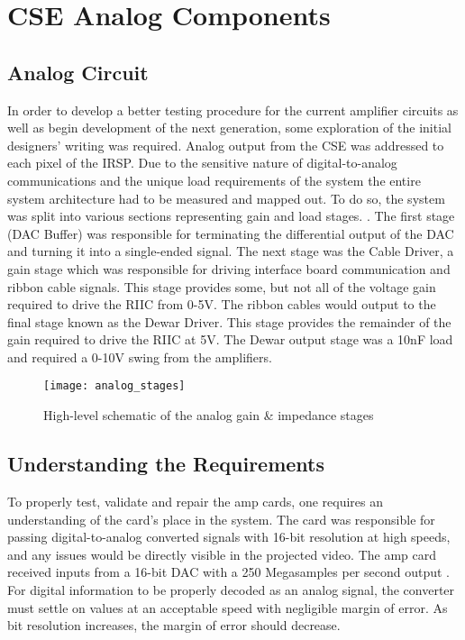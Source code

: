 %
%
\chapter{CSE Analog Components}
\section{Analog Circuit}
In order to develop a better testing procedure for the current amplifier circuits as well as begin development of the next generation, some exploration of the initial designers' writing was required. Analog output from the CSE was addressed to each pixel of the IRSP. Due to the sensitive nature of digital-to-analog communications and the unique load requirements of the system the entire system architecture had to be measured and mapped out. To do so, the system was split into various sections representing gain and load stages. \cite{marks}. The first stage (DAC Buffer) was responsible for terminating the differential output of the DAC and turning it into a single-ended signal. The next stage was the Cable Driver, a gain stage which was responsible for driving interface board communication and ribbon cable signals. This stage provides some, but not all of the voltage gain required to drive the RIIC from 0-5V. The ribbon cables would output to the final stage known as the Dewar Driver. This stage provides the remainder of the gain required to drive the RIIC at 5V. The Dewar output stage was a 10nF load and required a 0-10V swing from the amplifiers. \par
\begin{figure}[!htb]
	\texttt{[image: analog\_stages]}
	\centering
	\caption{High-level schematic of the analog gain \& impedance stages}
	\centering
\end{figure}
\section{Understanding the Requirements}
To properly test, validate and repair the amp cards, one requires an understanding of the card's place in the system. The card was responsible for passing digital-to-analog converted signals with 16-bit resolution at high speeds, and any issues would be directly visible in the projected video. The amp card received inputs from a 16-bit DAC with a 250 Megasamples per second output \cite{marks}. For digital information to be properly decoded as an analog signal, the converter must settle on values at an acceptable speed with negligible margin of error. As bit resolution increases, the margin of error should decrease.\par

